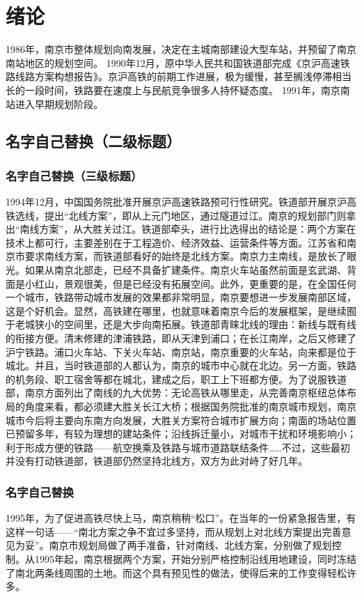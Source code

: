 \documentclass[bachelor]{njupthesis}
\begin{document}
\thesistableofcontents

\thesischapterexordium

\chapter{绪论}
1986年，南京市整体规划向南发展，决定在主城南部建设大型车站，并预留了南京南站地区的规划空间。
1990年12月，原中华人民共和国铁道部完成《京沪高速铁路线路方案构想报告》。京沪高铁的前期工作进展，极为缓慢，甚至搁浅停滞相当长的一段时间，铁路要在速度上与民航竞争很多人持怀疑态度。
1991年，南京南站进入早期规划阶段。

\section{名字自己替换（二级标题）}
\subsection{名字自己替换（三级标题）}
1994年12月，中国国务院批准开展京沪高速铁路预可行性研究。铁道部开展京沪高铁选线，提出“北线方案”，即从上元门地区，通过隧道过江。南京的规划部门则拿出“南线方案”，从大胜关过江。铁道部牵头，进行比选得出的结论是：两个方案在技术上都可行，主要差别在于工程造价、经济效益、运营条件等方面。江苏省和南京市要求南线方案，而铁道部看好的始终是北线方案。南京力主南线，是放长了眼光。如果从南京北部走，已经不具备扩建条件。南京火车站虽然前面是玄武湖、背面是小红山，景观很美，但是已经没有拓展空间。此外，更重要的是，在全国任何一个城市，铁路带动城市发展的效果都非常明显，南京要想进一步发展南部区域，这是个好机会。显然，高铁建在哪里，也就意味着南京今后的发展框架，是继续囿于老城狭小的空间里，还是大步向南拓展。铁道部青睐北线的理由：新线与既有线的衔接方便。清末修建的津浦铁路，即从天津到浦口；在长江南岸，之后又修建了沪宁铁路。浦口火车站、下关火车站、南京站，南京重要的火车站，向来都是位于城北。并且，当时铁道部的人都认为，南京的城市中心就在北边。另一方面，铁路的机务段、职工宿舍等都在城北，建成之后，职工上下班都方便。为了说服铁道部，南京方面列出了南线的九大优势：无论高铁从哪里走，从完善南京枢纽总体布局的角度来看，都必须建大胜关长江大桥；根据国务院批准的南京城市规划，南京城市今后将主要向东南方向发展，大胜关方案符合城市扩展方向；南面的场站位置已预留多年，有较为理想的建站条件；沿线拆迁量小，对城市干扰和环境影响小；利于形成方便的铁路——航空换乘及铁路与城市道路联结条件……不过，这些最初并没有打动铁道部，铁道部仍然坚持北线方，双方为此对峙了好几年。


\subsection{名字自己替换}
1995年，为了促进高铁尽快上马，南京稍稍“松口”。在当年的一份紧急报告里，有这样一句话——“南北方案之争不宜过多坚持，而从规划上对北线方案提出完善意见为妥”。南京市规划局做了两手准备，针对南线、北线方案，分别做了规划控制。从1995年起，南京根据两个方案，开始分别严格控制沿线用地建设，同时冻结了南北两条线周围的土地。而这个具有预见性的做法，使得后来的工作变得轻松许多。
\end{document}
